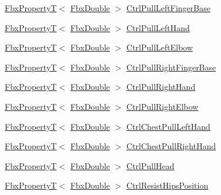 \begin{DoxyCompactItemize}
\item 
\hyperlink{class_fbx_property_t}{Fbx\+PropertyT}$<$ \hyperlink{fbxtypes_8h_a171e72a1c46fc15c1a6c9c31948c1c5b}{Fbx\+Double} $>$ \hyperlink{class_fbx_character_af2b72f5ec76ccfca0a59cba911ee42cd}{Ctrl\+Pull\+Left\+Finger\+Base}
\item 
\hyperlink{class_fbx_property_t}{Fbx\+PropertyT}$<$ \hyperlink{fbxtypes_8h_a171e72a1c46fc15c1a6c9c31948c1c5b}{Fbx\+Double} $>$ \hyperlink{class_fbx_character_a7d7dd16a8fffa5e2c277f8ec952bba6d}{Ctrl\+Pull\+Left\+Hand}
\item 
\hyperlink{class_fbx_property_t}{Fbx\+PropertyT}$<$ \hyperlink{fbxtypes_8h_a171e72a1c46fc15c1a6c9c31948c1c5b}{Fbx\+Double} $>$ \hyperlink{class_fbx_character_a92f7ba20e81f5bbe5ea18bb2476a2daf}{Ctrl\+Pull\+Left\+Elbow}
\item 
\hyperlink{class_fbx_property_t}{Fbx\+PropertyT}$<$ \hyperlink{fbxtypes_8h_a171e72a1c46fc15c1a6c9c31948c1c5b}{Fbx\+Double} $>$ \hyperlink{class_fbx_character_abf8f8567058b002645e8584572139d8e}{Ctrl\+Pull\+Right\+Finger\+Base}
\item 
\hyperlink{class_fbx_property_t}{Fbx\+PropertyT}$<$ \hyperlink{fbxtypes_8h_a171e72a1c46fc15c1a6c9c31948c1c5b}{Fbx\+Double} $>$ \hyperlink{class_fbx_character_a392d76b0a290f80f76f0aa9f7f513345}{Ctrl\+Pull\+Right\+Hand}
\item 
\hyperlink{class_fbx_property_t}{Fbx\+PropertyT}$<$ \hyperlink{fbxtypes_8h_a171e72a1c46fc15c1a6c9c31948c1c5b}{Fbx\+Double} $>$ \hyperlink{class_fbx_character_ad5f40480905710f698060eaee25b9f33}{Ctrl\+Pull\+Right\+Elbow}
\item 
\hyperlink{class_fbx_property_t}{Fbx\+PropertyT}$<$ \hyperlink{fbxtypes_8h_a171e72a1c46fc15c1a6c9c31948c1c5b}{Fbx\+Double} $>$ \hyperlink{class_fbx_character_a0b14fa3eedf09891f8b26348c44ba0a2}{Ctrl\+Chest\+Pull\+Left\+Hand}
\item 
\hyperlink{class_fbx_property_t}{Fbx\+PropertyT}$<$ \hyperlink{fbxtypes_8h_a171e72a1c46fc15c1a6c9c31948c1c5b}{Fbx\+Double} $>$ \hyperlink{class_fbx_character_a940ece5e038794193daa2c32e3d7c3b1}{Ctrl\+Chest\+Pull\+Right\+Hand}
\item 
\hyperlink{class_fbx_property_t}{Fbx\+PropertyT}$<$ \hyperlink{fbxtypes_8h_a171e72a1c46fc15c1a6c9c31948c1c5b}{Fbx\+Double} $>$ \hyperlink{class_fbx_character_a6ed3181826e8efd8b62ae4ea95cd3ef8}{Ctrl\+Pull\+Head}
\item 
\hyperlink{class_fbx_property_t}{Fbx\+PropertyT}$<$ \hyperlink{fbxtypes_8h_a171e72a1c46fc15c1a6c9c31948c1c5b}{Fbx\+Double} $>$ \hyperlink{class_fbx_character_a9df873c898296109d772b66c495158f2}{Ctrl\+Resist\+Hips\+Position}

\end{DoxyCompactItemize}
